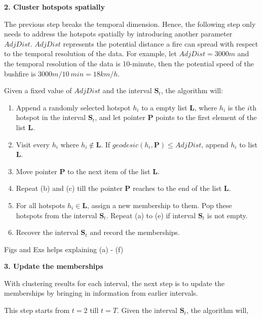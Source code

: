 \textbf{2. Cluster hotspots spatially}

The previous step breaks the temporal dimension. Hence, the following
step only needs to address the hotspots spatially by introducing another
parameter \(AdjDist\). \(AdjDist\) represents the potential distance a
fire can spread with respect to the temporal resolution of the data. For
example, let \(AdjDist = 3000 m\) and the temporal resolution of the
data is 10-minute, then the potential speed of the bushfire is
\(3000m/10~min = 18km/h\).

Given a fixed value of \(AdjDist\) and the interval
\(\boldsymbol{S}_t\), the algorithm will:

\begin{enumerate}
\def\labelenumi{(\alph{enumi})}
\item
  Append a randomly selected hotspot \(h_i\) to a empty list
  \(\boldsymbol{L}\), where \(h_i\) is the \(i\)th hotspot in the
  interval \(\boldsymbol{S}_t\), and let pointer \(\boldsymbol{P}\)
  points to the first element of the list \(\boldsymbol{L}\).
\item
  Visit every \(h_i\) where \(h_i \notin \boldsymbol{L}\). If
  \(geodesic(h_i, \boldsymbol{P})\leq AdjDist\), append \(h_i\) to list
  \(\boldsymbol{L}\).
\item
  Move pointer \(\boldsymbol{P}\) to the next item of the list
  \(\boldsymbol{L}\).
\item
  Repeat (b) and (c) till the pointer \(\boldsymbol{P}\) reaches to the
  end of the list \(\boldsymbol{L}\).
\item
  For all hotspots \(h_i \in \boldsymbol{L}\), assign a new membership
  to them. Pop these hotspots from the interval \(\boldsymbol{S}_t\).
  Repeat (a) to (e) if interval \(\boldsymbol{S}_t\) is not empty.
\item
  Recover the interval \(\boldsymbol{S}_t\) and record the memberships.
\end{enumerate}

Figs and Exs helps explaining (a) - (f)

\textbf{3. Update the memberships}

With clustering results for each interval, the next step is to update
the memberships by bringing in information from earlier intervals.

This step starts from \(t=2\) till \(t=T\). Given the interval
\(\boldsymbol{S}_t\), the algorithm will,

